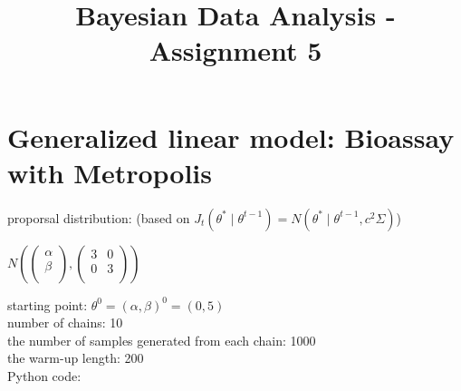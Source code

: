 \documentclass[article,11pt]{article}
\title{\huge Bayesian Data Analysis - Assignment 5}
\begin{document}
 \maketitle
 \section{{\small Generalized linear model: Bioassay with Metropolis}}
 proporsal distribution:
 (based on $J_{t}(\theta^{*} \mid \theta^{t-1})=N(\theta^{*} \mid \theta^{t-1},c^{2}\Sigma)$) \\
 \begin{center}
 	$N\left( \left(\begin{matrix}
 	\alpha \\
 	\beta \\
 	\end{matrix}\right),\left( \begin{matrix}
 	3&0 \\
 	0&3 \\
 	\end{matrix}\right) \right) $ \\
 \end{center}
 starting point: $\theta^{0}=(\alpha,\beta)^{0}=(0,5)$ \\
 number of chains: 10 \\
 the number of samples generated from each chain: 1000 \\
 the warm-up length: 200 \\
 Python code:
\end{document}
